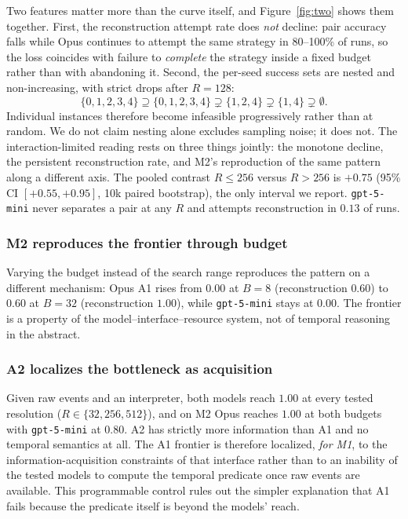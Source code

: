 \documentclass[sigconf,anonymous,review]{acmart}
\begin{document}
Two features matter more than the curve itself, and Figure~\ref{fig:two} shows them together.
First, the reconstruction attempt rate does \emph{not} decline: pair accuracy falls while Opus continues to attempt the same strategy in
80--100\% of runs, so the loss coincides with failure to \emph{complete} the strategy inside a
fixed budget rather than with abandoning it. Second, the per-seed success sets are nested and
non-increasing, with strict drops after $R{=}128$:
\[
\{0,1,2,3,4\}\supseteq\{0,1,2,3,4\}\supsetneq\{1,2,4\}\supsetneq\{1,4\}\supsetneq\emptyset .
\]
Individual instances therefore become infeasible progressively rather than at random. We do not
claim nesting alone excludes sampling noise; it does not. The interaction-limited reading rests
on three things jointly: the monotone decline, the persistent reconstruction rate, and M2's
reproduction of the same pattern along a different axis.
The pooled contrast $R\le256$ versus $R>256$ is $+0.75$ (95\% CI $[+0.55,+0.95]$, 10k paired
bootstrap), the only interval we report. \texttt{gpt-5-mini} never separates a pair at any $R$ and
attempts reconstruction in $0.13$ of runs.

\subsubsection{M2 reproduces the frontier through budget}
Varying the budget instead of the search range reproduces the pattern on a different mechanism:
Opus A1 rises from $0.00$ at $B{=}8$ (reconstruction $0.60$) to $0.60$ at $B{=}32$ (reconstruction
$1.00$), while \texttt{gpt-5-mini} stays at $0.00$. The frontier is a property of the
model--interface--resource system, not of temporal reasoning in the abstract.

\subsubsection{A2 localizes the bottleneck as acquisition}
Given raw events and an interpreter, both models reach $1.00$ at every tested resolution
($R\in\{32,256,512\}$), and on M2 Opus reaches $1.00$ at both budgets with \texttt{gpt-5-mini} at
$0.80$. A2 has strictly more information than A1 and no temporal semantics at all. The A1 frontier
is therefore localized, \emph{for M1}, to the information-acquisition constraints of that interface
rather than to an inability of the tested models to compute the temporal predicate once raw events
are available. This programmable control rules out the simpler explanation that A1 fails because
the predicate itself is beyond the models' reach.
\end{document}
